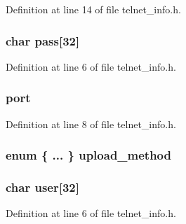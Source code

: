 Definition at line 14 of file telnet\+\_\+info.\+h.

\subsubsection[{\texorpdfstring{pass}{pass}}]{\setlength{\rightskip}{0pt plus 5cm}char pass\mbox{[}32\mbox{]}}\hypertarget{structtelnet__info_ade137af880b61e4c68fb2dcc274dd1c0}{}\label{structtelnet__info_ade137af880b61e4c68fb2dcc274dd1c0}


Definition at line 6 of file telnet\+\_\+info.\+h.

\subsubsection[{\texorpdfstring{port}{port}}]{ port}\hypertarget{structtelnet__info_ac9ee24e988b48236762f815b201bed8a}{}\label{structtelnet__info_ac9ee24e988b48236762f815b201bed8a}


Definition at line 8 of file telnet\+\_\+info.\+h.

\subsubsection[{\texorpdfstring{upload\+\_\+method}{upload_method}}]{\setlength{\rightskip}{0pt plus 5cm}enum \{ ... \}   upload\+\_\+method}\hypertarget{structtelnet__info_aec0c66f6602f002f54e80b170f60a817}{}\label{structtelnet__info_aec0c66f6602f002f54e80b170f60a817}
\subsubsection[{\texorpdfstring{user}{user}}]{\setlength{\rightskip}{0pt plus 5cm}char user\mbox{[}32\mbox{]}}\hypertarget{structtelnet__info_ab34a32fb3324f0fc33c8d7d44c46ebf9}{}\label{structtelnet__info_ab34a32fb3324f0fc33c8d7d44c46ebf9}


Definition at line 6 of file telnet\+\_\+info.\+h.

